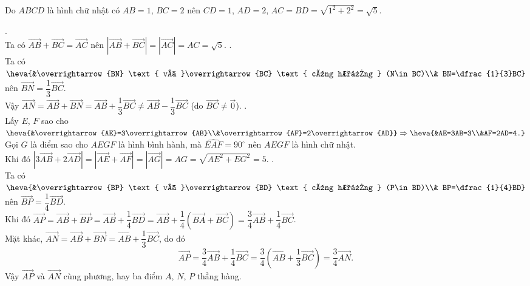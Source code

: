 \begin{ex}
{\begin{center}
		\end{center}
		Do $ABCD$ là hình chữ nhật có $AB=1$, $BC=2$ nên $CD=1$, $AD=2$, $AC=BD=\sqrt{1^2+2^2}=\sqrt{5}$.
		\begin{itemchoice}
			.\\
			Ta có $\overrightarrow{AB}+\overrightarrow{BC}=\overrightarrow{AC}$ nên $\left|\overrightarrow{AB}+\overrightarrow{BC}\right|=\left|\overrightarrow{AC}\right|=AC=\sqrt{5}$.		.\\
			Ta có $\heva{&\overrightarrow{BN} \text{ và }\overrightarrow{BC} \text{ cùng hướng } (N\in BC)\\& BN=\dfrac{1}{3}BC}$ nên $\overrightarrow{BN}=\dfrac{1}{3}\overrightarrow{BC}$. \\
			Vậy $\overrightarrow{AN}=\overrightarrow{AB}+\overrightarrow{BN}=\overrightarrow{AB}+\dfrac{1}{3}\overrightarrow{BC}\neq \overrightarrow{AB}-\dfrac{1}{3}\overrightarrow{BC}$ (do $\overrightarrow{BC}\neq \overrightarrow{0}$).
			.\\
			Lấy $E$, $F$ sao cho $\heva{&\overrightarrow{AE}=3\overrightarrow{AB}\\&\overrightarrow{AF}=2\overrightarrow{AD}}\Rightarrow \heva{&AE=3AB=3\\&AF=2AD=4.}$\\
			Gọi $G$ là điểm sao cho $AEGF$ là hình bình hành, mà $\widehat{EAF}=90^\circ$ nên $AEGF$ là hình chữ nhật.\\
			Khi đó $\left|3\overrightarrow{AB}+2\overrightarrow{AD}\right|=\left|\overrightarrow{AE}+\overrightarrow{AF}\right|=\left|\overrightarrow{AG}\right|=AG=\sqrt{AE^2+EG^2}=5$.
			.\\
			Ta có $\heva{&\overrightarrow{BP} \text{ và }\overrightarrow{BD} \text{ cùng hướng } (P\in BD)\\& BP=\dfrac{1}{4}BD}$ nên $\overrightarrow{BP}=\dfrac{1}{4}\overrightarrow{BD}$. \\
			Khi đó $\overrightarrow{AP}=\overrightarrow{AB}+\overrightarrow{BP}=\overrightarrow{AB}+\dfrac{1}{4}\overrightarrow{BD}=\overrightarrow{AB}+\dfrac{1}{4}\left(\overrightarrow{BA}+\overrightarrow{BC}\right)=\dfrac{3}{4}\overrightarrow{AB}+\dfrac{1}{4}\overrightarrow{BC}$.\\ 
			Mặt khác, $\overrightarrow{AN}=\overrightarrow{AB}+\overrightarrow{BN}=\overrightarrow{AB}+\dfrac{1}{3}\overrightarrow{BC}$, do đó
			\[\overrightarrow{AP}=\dfrac{3}{4}\overrightarrow{AB}+\dfrac{1}{4}\overrightarrow{BC}=\dfrac{3}{4}\left(\overrightarrow{AB}+\dfrac{1}{3}\overrightarrow{BC}\right)=\dfrac{3}{4}\overrightarrow{AN}.\]
			Vậy $\overrightarrow{AP}$ và $\overrightarrow{AN}$ cùng phương, hay ba điểm $A$, $N$, $P$ thẳng hàng.
		\end{itemchoice}
	}
\end{ex}

